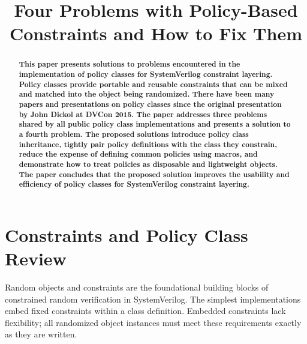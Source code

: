 \documentclass[conference,onecolumn]{IEEEtran}
\begin{document}
\title{Four Problems with Policy-Based Constraints and How to Fix Them}

\author{
    \and
}

\maketitle

\thispagestyle{plain}
\pagestyle{plain}

\begin{abstract}
\textbf{
    This paper presents solutions to problems encountered in the implementation of policy classes for SystemVerilog constraint layering. Policy classes provide portable and reusable constraints that can be mixed and matched into the object being randomized. There have been many papers and presentations on policy classes since the original presentation by John Dickol at DVCon 2015. The paper addresses three problems shared by all public policy class implementations and presents a solution to a fourth problem. The proposed solutions introduce policy class inheritance, tightly pair policy definitions with the class they constrain, reduce the expense of defining common policies using macros, and demonstrate how to treat policies as disposable and lightweight objects. The paper concludes that the proposed solution improves the usability and efficiency of policy classes for SystemVerilog constraint layering.
}
\end{abstract}

\section{Constraints and Policy Class Review}

Random objects and constraints are the foundational building blocks of constrained random verification in SystemVerilog. The simplest implementations embed fixed constraints within a class definition.  Embedded constraints lack flexibility; all randomized object instances must meet these requirements exactly as they are written.
\end{document}
